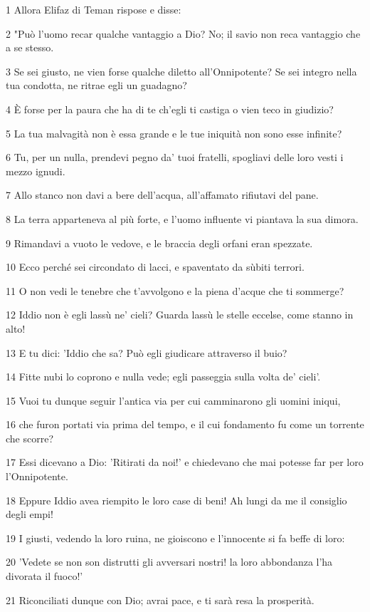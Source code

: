 \par 1 Allora Elifaz di Teman rispose e disse:
\par 2 "Può l'uomo recar qualche vantaggio a Dio? No; il savio non reca vantaggio che a se stesso.
\par 3 Se sei giusto, ne vien forse qualche diletto all'Onnipotente? Se sei integro nella tua condotta, ne ritrae egli un guadagno?
\par 4 È forse per la paura che ha di te ch'egli ti castiga o vien teco in giudizio?
\par 5 La tua malvagità non è essa grande e le tue iniquità non sono esse infinite?
\par 6 Tu, per un nulla, prendevi pegno da' tuoi fratelli, spogliavi delle loro vesti i mezzo ignudi.
\par 7 Allo stanco non davi a bere dell'acqua, all'affamato rifiutavi del pane.
\par 8 La terra apparteneva al più forte, e l'uomo influente vi piantava la sua dimora.
\par 9 Rimandavi a vuoto le vedove, e le braccia degli orfani eran spezzate.
\par 10 Ecco perché sei circondato di lacci, e spaventato da sùbiti terrori.
\par 11 O non vedi le tenebre che t'avvolgono e la piena d'acque che ti sommerge?
\par 12 Iddio non è egli lassù ne' cieli? Guarda lassù le stelle eccelse, come stanno in alto!
\par 13 E tu dici: 'Iddio che sa? Può egli giudicare attraverso il buio?
\par 14 Fitte nubi lo coprono e nulla vede; egli passeggia sulla volta de' cieli'.
\par 15 Vuoi tu dunque seguir l'antica via per cui camminarono gli uomini iniqui,
\par 16 che furon portati via prima del tempo, e il cui fondamento fu come un torrente che scorre?
\par 17 Essi dicevano a Dio: 'Ritirati da noi!' e chiedevano che mai potesse far per loro l'Onnipotente.
\par 18 Eppure Iddio avea riempito le loro case di beni! Ah lungi da me il consiglio degli empi!
\par 19 I giusti, vedendo la loro ruina, ne gioiscono e l'innocente si fa beffe di loro:
\par 20 'Vedete se non son distrutti gli avversari nostri! la loro abbondanza l'ha divorata il fuoco!'
\par 21 Riconciliati dunque con Dio; avrai pace, e ti sarà resa la prosperità.
